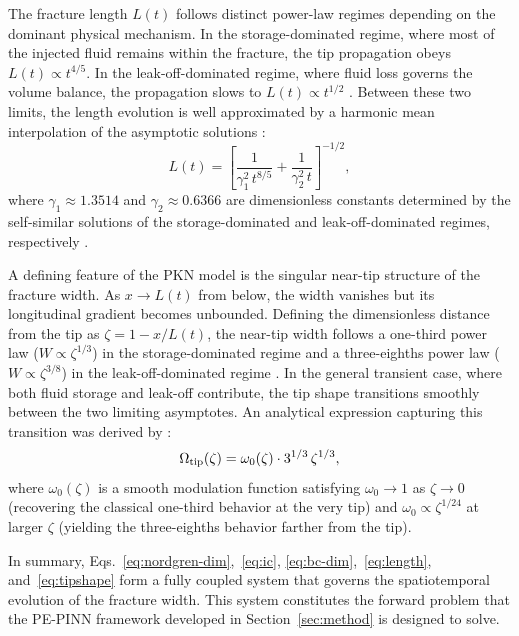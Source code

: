 \documentclass[a4paper,fleqn]{cas-sc}
\begin{document}
The fracture length $L(t)$ follows distinct power-law regimes depending
on the dominant physical mechanism. In the storage-dominated regime,
where most of the injected fluid remains within the fracture, the tip
propagation obeys $L(t) \propto t^{4/5}$. In the leak-off-dominated
regime, where fluid loss governs the volume balance, the propagation
slows to $L(t) \propto t^{1/2}$ \cite{Nordgren1972,Kemp1990}. Between
these two limits, the length evolution is well approximated by a
harmonic mean interpolation of the asymptotic solutions
\cite{Detournay2016}:
\begin{equation}
  L(t) = \left[\frac{1}{\gamma_1^2 \, t^{8/5}}
       + \frac{1}{\gamma_2^2 \, t}\right]^{-1/2},
  \label{eq:length}
\end{equation}
where $\gamma_1 \approx 1.3514$ and $\gamma_2 \approx 0.6366$ are
dimensionless constants determined by the self-similar solutions of
the storage-dominated and leak-off-dominated regimes, respectively
\cite{Kemp1990,Detournay2016}.

A defining feature of the PKN model is the singular near-tip structure
of the fracture width. As $x \to L(t)$ from below, the width vanishes
but its longitudinal gradient becomes unbounded. Defining the
dimensionless distance from the tip as $\zeta = 1 - x/L(t)$, the
near-tip width follows a one-third power law ($W \propto \zeta^{1/3}$)
in the storage-dominated regime and a three-eighths power law
($W \propto \zeta^{3/8}$) in the leak-off-dominated regime
\cite{Linkov2015,Detournay2016}. In the general transient case, where
both fluid storage and leak-off contribute, the tip shape transitions
smoothly between the two limiting asymptotes. An analytical expression
capturing this transition was derived by \citet{Linkov2015}:
\begin{equation}
  \Omega_{\rm tip}(\zeta)
  = \omega_0(\zeta) \cdot 3^{1/3}\,\zeta^{1/3},
  \label{eq:tipshape}
\end{equation}
where $\omega_0(\zeta)$ is a smooth modulation function satisfying
$\omega_0 \to 1$ as $\zeta \to 0$ (recovering the classical one-third
behavior at the very tip) and $\omega_0 \propto \zeta^{1/24}$ at larger
$\zeta$ (yielding the three-eighths behavior farther from the tip).

In summary, Eqs.~\eqref{eq:nordgren-dim},~\eqref{eq:ic},
\eqref{eq:bc-dim},~\eqref{eq:length}, and~\eqref{eq:tipshape} form a
fully coupled system that governs the spatiotemporal evolution of the
fracture width. This system constitutes the forward problem that the
PE-PINN framework developed in Section~\ref{sec:method} is designed
to solve.
\end{document}
